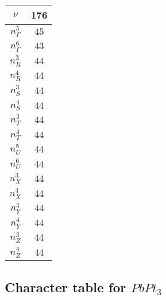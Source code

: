 \documentclass[3p,preprint]{elsarticle}
\begin{document}
\begin{table}[H]
	\begin{tabular}{|c|c|}\hline
		$\nu$ & 176 \\ \hline \hline
		$n_{\Gamma}^{5}$ & $45$\\ \hline
		$n_{\Gamma}^{6}$ & $43$\\ \hline \hline
		$n_{R}^{3}$ & $44$\\ \hline
		$n_{R}^{4}$ & $44$\\ \hline \hline
		$n_{S}^{3}$ & $44$\\ \hline 
		$n_{S}^{4}$ & $44$\\ \hline  \hline
		$n_{T}^{3}$ & $44$\\ \hline
		$n_{T}^{4}$ & $44$\\ \hline \hline
		$n_{U}^{5}$ & $44$\\ \hline
		$n_{U}^{6}$ & $44$\\ \hline \hline
		$n_{X}^{3}$ & $44$\\ \hline
		$n_{X}^{4}$ & $44$\\ \hline \hline
		$n_{Y}^{3}$ & $44$\\ \hline
		$n_{Y}^{4}$ & $44$\\ \hline \hline
		$n_{Z}^{3}$ & $44$\\ \hline
		$n_{Z}^{4}$ & $44$\\ \hline
	\end{tabular}
\end{table}


\subsection{Character table for $PbPt_3$~\cite{Bilbao}}\label{app:ch-pbpt3}
\end{document}
